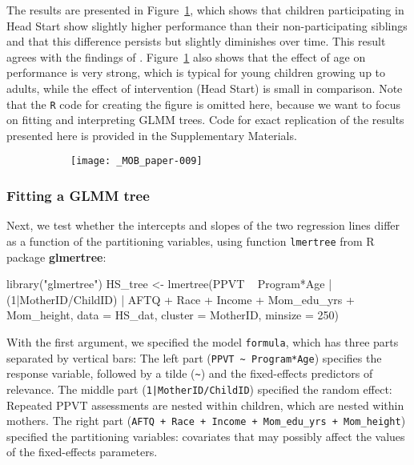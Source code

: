 \documentclass[doc,floatsintext,natbib]{apa7}
\begin{document}
The results are presented in Figure~\ref{fig:global_lmm}, which shows that children participating in Head Start show slightly higher performance than their non-participating siblings and that this difference persists but slightly diminishes over time. This result agrees with the findings of \cite{Demi09}. Figure~\ref{fig:global_lmm} also shows that the effect of age on performance is very strong, which is typical for young children growing up to adults, while the effect of intervention (Head Start) is small in comparison. Note that the \texttt{R} code for creating the figure is omitted here, because we want to focus on fitting and interpreting GLMM trees. Code for exact replication of the results presented here is provided in the Supplementary Materials. 



\begin{figure}%
\caption{}
\begin{subfigure}{.7\textwidth}
\texttt{[image: \_MOB\_paper-009]}
\end{subfigure}
\label{fig:global_lmm}
\end{figure}%

\FloatBarrier
\subsubsection{Fitting a GLMM tree}

Next, we test whether the intercepts and slopes of the two regression lines differ as a function of the partitioning variables, using function \verb|lmertree| from R package \textbf{glmertree}:

\begin{Schunk}
\begin{Sinput}
 library("glmertree")
 HS_tree <- lmertree(PPVT ~ Program*Age | (1|MotherID/ChildID) | AFTQ + Race + 
                       Income + Mom_edu_yrs + Mom_height, 
                     data = HS_dat, cluster = MotherID, minsize = 250)
\end{Sinput}
\end{Schunk}

With the first argument, we specified the model \verb|formula|, which has three parts separated by vertical bars: The left part (\verb|PPVT ~ Program*Age|) specifies the response variable, followed by a tilde (\verb|~|) and the fixed-effects predictors of relevance. The middle part (\texttt{1|MotherID/ChildID}) specified the random effect: Repeated PPVT assessments are nested within children, which are nested within mothers. The right part (\verb|AFTQ + Race + Income + Mom_edu_yrs + Mom_height|) specified the partitioning variables: covariates that may possibly affect the values of the fixed-effects parameters. 
\end{document}
